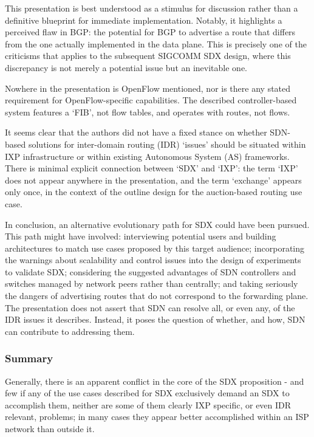 This presentation is best understood as a stimulus for discussion rather than a definitive blueprint for immediate implementation. Notably, it highlights a perceived flaw in BGP: the potential for BGP to advertise a route that differs from the one actually implemented in the data plane. This is precisely one of the criticisms that applies to the subsequent SIGCOMM SDX design, where this discrepancy is not merely a potential issue but an inevitable one.

Nowhere in the presentation is OpenFlow mentioned, nor is there any stated requirement for OpenFlow-specific capabilities. The described controller-based system features a `FIB', not flow tables, and operates with routes, not flows.

It seems clear that the authors did not have a fixed stance on whether SDN-based solutions for inter-domain routing (IDR) `issues' should be situated within IXP infrastructure or within existing Autonomous System (AS) frameworks. There is minimal explicit connection between `SDX' and `IXP': the term `IXP' does not appear anywhere in the presentation, and the term `exchange' appears only once, in the context of the outline design for the auction-based routing use case.
\bigskip

In conclusion, an alternative evolutionary path for SDX could have been pursued. This path might have involved: interviewing potential users and building architectures to match use cases proposed by this target audience; incorporating the warnings about scalability and control issues into the design of experiments to validate SDX; considering the suggested advantages of SDN controllers and switches managed by network peers rather than centrally; and taking seriously the dangers of advertising routes that do not correspond to the forwarding plane.
The presentation does not assert that SDN can resolve all, or even any, of the IDR issues it describes. Instead, it poses the question of whether, and how, SDN can contribute to addressing them.

\subsubsection{Summary}
Generally, there is an apparent conflict in the core of the SDX proposition - and few if any of the use cases described for SDX exclusively demand an SDX to accomplish them, neither are some of them clearly IXP specific, or even IDR relevant, problems; in many cases they appear better accomplished within an ISP network than outside it.

